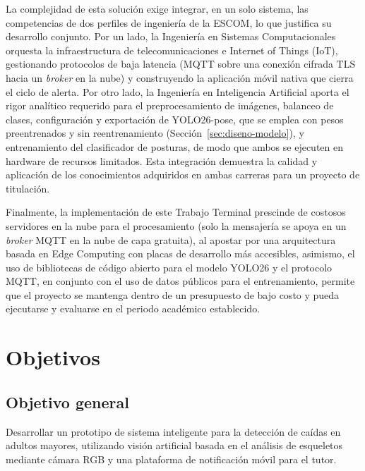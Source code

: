 \documentclass[12pt,a4paper,oneside]{book}
\theoremstyle{plain}
\theoremstyle{definition}
\theoremstyle{remark}
\begin{document}
La complejidad de esta solución exige integrar, en un solo sistema, las competencias de dos perfiles de ingeniería de la ESCOM, lo que justifica su desarrollo conjunto. Por un lado, la Ingeniería en Sistemas Computacionales orquesta la infraestructura de telecomunicaciones e Internet of Things (IoT), gestionando protocolos de baja latencia (MQTT sobre una conexión cifrada TLS hacia un \textit{broker} en la nube) y construyendo la aplicación móvil nativa que cierra el ciclo de alerta. Por otro lado, la Ingeniería en Inteligencia Artificial aporta el rigor analítico requerido para el preprocesamiento de imágenes, balanceo de clases, configuración y exportación de YOLO26-pose, que se emplea con pesos preentrenados y sin reentrenamiento (Sección~\ref{sec:diseno-modelo}), y entrenamiento del clasificador de posturas, de modo que ambos se ejecuten en hardware de recursos limitados. Esta integración demuestra la calidad y aplicación de los conocimientos adquiridos en ambas carreras para un proyecto de titulación.

Finalmente, la implementación de este Trabajo Terminal prescinde de costosos servidores en la nube para el procesamiento (solo la mensajería se apoya en un \textit{broker} MQTT en la nube de capa gratuita), al apostar por una arquitectura basada en Edge Computing con placas de desarrollo más accesibles, asimismo, el uso de bibliotecas de código abierto para el modelo YOLO26 y el protocolo MQTT, en conjunto con el uso de datos públicos para el entrenamiento, permite que el proyecto se mantenga dentro de un presupuesto de bajo costo y pueda ejecutarse y evaluarse en el periodo académico establecido.


\section{Objetivos}
\subsection{Objetivo general}
Desarrollar un prototipo de sistema inteligente para la detección de caídas en adultos mayores, utilizando visión artificial basada en el análisis de esqueletos mediante cámara RGB y una plataforma de notificación móvil para el tutor.
\end{document}
